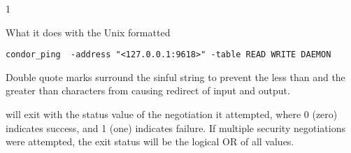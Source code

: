 \begin{ManPage}{\label{man-condor-ping}}{1}
\Examples

What it does with the Unix formatted
\begin{verbatim}
condor_ping  -address "<127.0.0.1:9618>" -table READ WRITE DAEMON
\end{verbatim}
Double quote marks surround the sinful string to prevent the
less than and the greater than characters from causing redirect of
input and output.

\ExitStatus

 will exit with the status value of the negotiation
it attempted,
where 0 (zero) indicates success, and 1 (one) indicates failure.
If multiple security negotiations were attempted, 
the exit status will be the logical OR of all values.

\end{ManPage}
